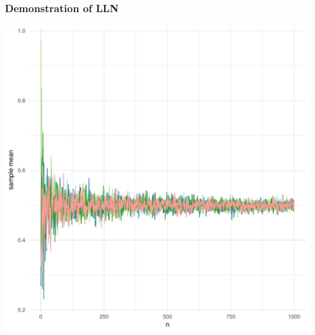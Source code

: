 \begin{frame}
  \frametitle{Demonstration of LLN}

  \includegraphics[height=\figheight,width=\figwidth]{llnPlot}
\end{frame}


